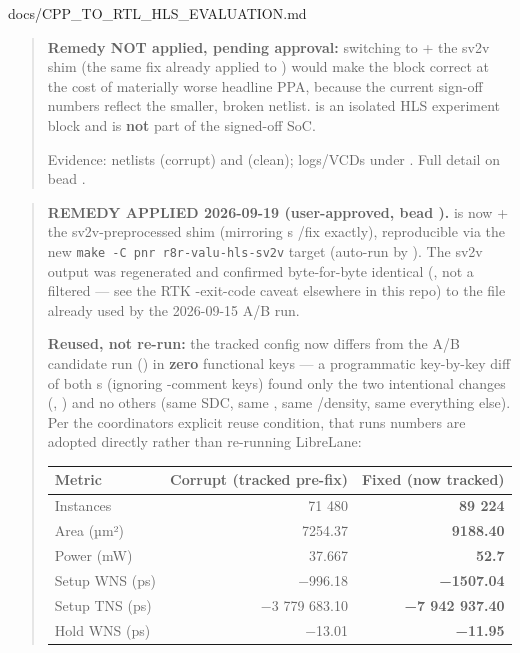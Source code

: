 \begin{relocated}{docs/CPP_TO_RTL_HLS_EVALUATION.md}
\begin{quote}
\textbf{Remedy NOT applied, pending approval:} switching
 to  + the
sv2v shim (the same fix already applied to ) would
make the block correct at the cost of materially worse headline PPA,
because the current sign-off numbers reflect the smaller, broken
netlist.  is an isolated HLS experiment block and is
\textbf{not} part of the signed-off SoC.

Evidence: netlists
(corrupt) and
(clean); logs/VCDs under . Full detail on
bead .
\end{quote}

\begin{quote}
\ok{} \textbf{REMEDY APPLIED 2026-09-19 (user-approved, bead
).}  is now
 + the sv2v-preprocessed shim (mirroring
\textquotesingle s
/fix exactly), reproducible via the new
\texttt{make\ -\allowbreak{}C\ pnr\ r8r-\allowbreak{}valu-\allowbreak{}hls-\allowbreak{}sv2v}
target (auto-run by ). The sv2v output
was regenerated and confirmed byte-for-byte identical (,
not a filtered  --- see the RTK -exit-code caveat
elsewhere in this repo) to the file already used by the 2026-09-15 A/B
run.

\textbf{Reused, not re-run:} the tracked config now differs from the A/B
candidate run () in \textbf{zero}
functional keys --- a programmatic key-by-key diff of both
s (ignoring \code{//}-comment keys) found only the two
intentional changes (, ) and no
others (same SDC, same , same
/density, same everything else). Per the
coordinator\textquotesingle s explicit reuse condition, that
run\textquotesingle s numbers are adopted directly rather than
re-running LibreLane:

{
\begin{longtable}[]{@{}lrr@{}}
\toprule\noalign{}
Metric & Corrupt (tracked pre-fix) & \textbf{Fixed (now tracked)} \\
\midrule\noalign{}
\endhead
\bottomrule\noalign{}
\endlastfoot
Instances & 71 480 & \textbf{89 224} \\
Area (µm²) & 7254.37 & \textbf{9188.40} \\
Power (mW) & 37.667 & \textbf{52.7} \\
Setup WNS (ps) & −996.18 & \textbf{−1507.04} \\
Setup TNS (ps) & −3 779 683.10 & \textbf{−7 942 937.40} \\
Hold WNS (ps) & −13.01 & \textbf{−11.95} \\
\end{longtable}
}


\end{quote}
\end{relocated}

